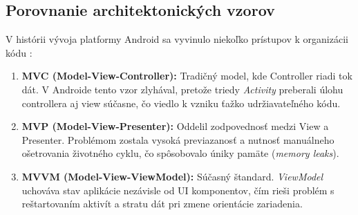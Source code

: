 \subsection{Porovnanie architektonických vzorov}
V histórii vývoja platformy Android sa vyvinulo niekoľko prístupov k organizácii kódu \cite{hostragons2025mvc}:

\begin{enumerate}[noitemsep]
    \item \textbf{MVC (Model-View-Controller):} Tradičný model, kde Controller riadi tok dát. V Androide tento vzor zlyhával, pretože triedy \textit{Activity} preberali úlohu controllera aj view súčasne, čo viedlo k vzniku ťažko udržiavateľného kódu.
    \item \textbf{MVP (Model-View-Presenter):} Oddelil zodpovednosť medzi View a Presenter. Problémom zostala vysoká previazanosť a nutnosť manuálneho ošetrovania životného cyklu, čo spôsobovalo úniky pamäte (\textit{memory leaks}).
    \item \textbf{MVVM (Model-View-ViewModel):} Súčasný štandard. \textit{ViewModel} uchováva stav aplikácie nezávisle od UI komponentov, čím rieši problém s reštartovaním aktivít a stratu dát pri zmene orientácie zariadenia.
\end{enumerate}\cite{hostragons2025mvc}